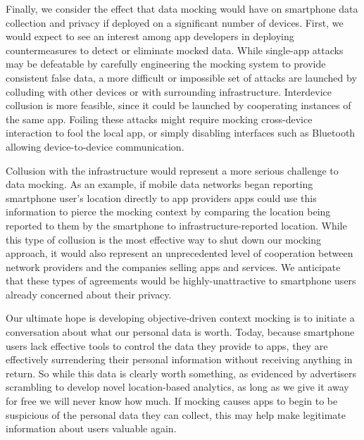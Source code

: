 Finally, we consider the effect that data mocking would have on smartphone
data collection and privacy if deployed on a significant number of devices.
First, we would expect to see an interest among app developers in deploying
countermeasures to detect or eliminate mocked data. While single-app attacks
may be defeatable by carefully engineering the mocking system to provide
consistent false data, a more difficult or impossible set of attacks are
launched by colluding with other devices or with surrounding infrastructure.
Interdevice collusion is more feasible, since it could be launched by
cooperating instances of the same app. Foiling these attacks might require
mocking cross-device interaction to fool the local app, or simply disabling
interfaces such as Bluetooth allowing device-to-device communication.

Collusion with the infrastructure would represent a more serious challenge to
data mocking. As an example, if mobile data networks began reporting
smartphone user's location directly to app providers apps could use this
information to pierce the mocking context by comparing the location being
reported to them by the smartphone to infrastructure-reported location. While
this type of collusion is the most effective way to shut down our mocking
approach, it would also represent an unprecedented level of cooperation
between network providers and the companies selling apps and services. We
anticipate that these types of agreements would be highly-unattractive to
smartphone users already concerned about their privacy.

\newpage

Our ultimate hope is developing objective-driven context mocking is to
initiate a conversation about what our personal data is worth. Today, because
smartphone users lack effective tools to control the data they provide to
apps, they are effectively surrendering their personal information without
receiving anything in return. So while this data is clearly worth something,
as evidenced by advertisers scrambling to develop novel location-based
analytics, as long as we give it away for free we will never know how much.
If mocking causes apps to begin to be suspicious of the personal data they
can collect, this may help make legitimate information about users valuable
again.
